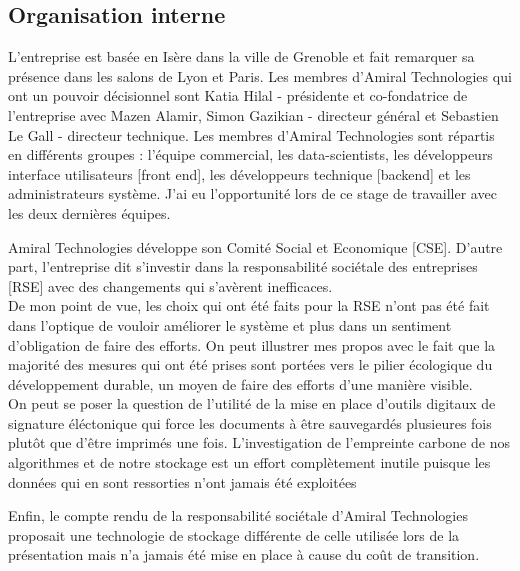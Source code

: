 \subsection{Organisation interne}
L'entreprise est basée en Isère dans la ville de Grenoble et fait remarquer sa présence dans les salons de Lyon et Paris.
Les membres d'Amiral Technologies qui ont un pouvoir décisionnel sont Katia Hilal - présidente et co-fondatrice de l'entreprise avec Mazen Alamir, Simon Gazikian - directeur général et Sebastien Le Gall - directeur technique.
Les membres d'Amiral Technologies sont répartis en différents groupes : l'équipe commercial, les data-scientists, les développeurs interface utilisateurs [front end], les développeurs technique [backend] et les administrateurs système.
J'ai eu l'opportunité lors de ce stage de travailler avec les deux dernières équipes.


Amiral Technologies développe son Comité Social et Economique [CSE].
D'autre part, l'entreprise dit s'investir dans la responsabilité sociétale des entreprises [RSE] avec des changements qui s'avèrent inefficaces.
\\
De mon point de vue, les choix qui ont été faits pour la RSE n'ont pas été fait dans l'optique de vouloir améliorer le système et plus dans un sentiment d'obligation de faire des efforts.
On peut illustrer mes propos avec le fait que la majorité des mesures qui ont été prises sont portées vers le pilier écologique du développement durable, un moyen de faire des efforts d'une manière visible.
\\
On peut se poser la question de l'utilité de la mise en place d'outils digitaux de signature éléctonique qui force les documents à être sauvegardés plusieures fois plutôt que d'être imprimés une fois.
L’investigation de l’empreinte carbone de nos algorithmes et de notre stockage est un effort complètement inutile puisque les données qui en sont ressorties n'ont jamais été exploitées

Enfin, le compte rendu de la responsabilité sociétale d'Amiral Technologies proposait une technologie de stockage différente de celle utilisée lors de la présentation mais n'a jamais été mise en place à cause du coût de transition.







